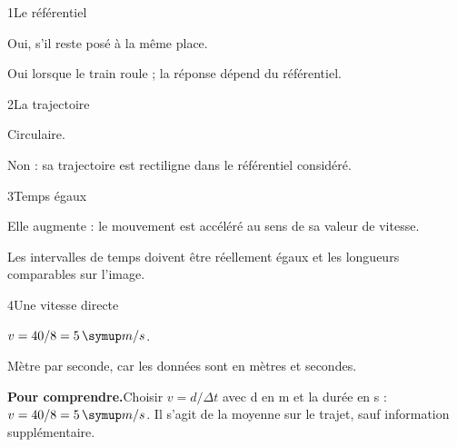 \par\noindent\begin{minipage}{\linewidth}
\begin{corrige}{1}{Le référentiel}
\begin{questions}
\item Oui, s’il reste posé à la même place.
\item Oui lorsque le train roule ; la réponse dépend du référentiel.
\end{questions}
\end{corrige}
\end{minipage}
\par\noindent\begin{minipage}{\linewidth}
\begin{corrige}{2}{La trajectoire}
\begin{questions}
\item Circulaire.
\item Non : sa trajectoire est rectiligne dans le référentiel considéré.
\end{questions}
\end{corrige}
\end{minipage}
\par\noindent\begin{minipage}{\linewidth}
\begin{corrige}{3}{Temps égaux}
\begin{questions}
\item Elle augmente : le mouvement est accéléré au sens de sa valeur de vitesse.
\item Les intervalles de temps doivent être réellement égaux et les longueurs comparables sur l’image.
\end{questions}
\end{corrige}
\end{minipage}
\par\noindent\begin{minipage}{\linewidth}
\begin{corrige}{4}{Une vitesse directe}
\begin{questions}
\item $v=40/8=5\unite{m/s}$.
\item Mètre par seconde, car les données sont en mètres et secondes.
\end{questions}
\par\smallskip\noindent\textbf{Pour comprendre.}\enspace Choisir $v=d/\Delta t$ avec d en m et la durée en s : $v=40/8=5\unite{m/s}$. Il s’agit de la moyenne sur le trajet, sauf information supplémentaire.\par
\end{corrige}
\end{minipage}
